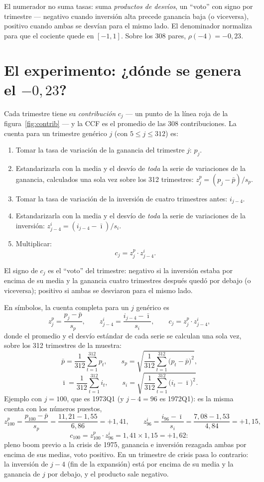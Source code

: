 \documentclass[11pt,a4paper]{article}
\begin{document}
El numerador no suma tasas: suma \emph{productos de desv\'ios}, un ``voto'' con
signo por trimestre --- negativo cuando inversi\'on alta precede ganancia baja
(o viceversa), positivo cuando ambas se desv\'ian para el mismo lado. El
denominador normaliza para que el cociente quede en $[-1,1]$. Sobre los 308
pares, $\rho(-4) = -0{,}23$.

\section{El experimento: ¿d\'onde se genera el $-0{,}23$?}

Cada trimestre tiene su \emph{contribuci\'on} $c_j$ --- un punto de la l\'inea
roja de la figura~\ref{fig:contrib} --- y la CCF es el promedio de las 308
contribuciones. La cuenta para un trimestre gen\'erico $j$ (con
$5 \leq j \leq 312$) es:
\begin{enumerate}
\item Tomar la tasa de variaci\'on de la ganancia del trimestre $j$: $p_j$.
\item Estandarizarla con la media y el desv\'io de \emph{toda} la serie de
variaciones de la ganancia, calculados una sola vez sobre los 312 trimestres:
$z^p_j = (p_j - \bar p)/s_p$.
\item Tomar la tasa de variaci\'on de la inversi\'on de cuatro trimestres
antes: $i_{j-4}$.
\item Estandarizarla con la media y el desv\'io de \emph{toda} la serie de
variaciones de la inversi\'on: $z^i_{j-4} = (i_{j-4} - \bar\imath)/s_i$.
\item Multiplicar:
\[
c_j = z^p_j \cdot z^i_{j-4}.
\]
\end{enumerate}
El signo de $c_j$ es el ``voto'' del trimestre: negativo si la inversi\'on
estaba por encima de su media y la ganancia cuatro trimestres despu\'es qued\'o
por debajo (o viceversa); positivo si ambas se desviaron para el mismo lado.

En s\'imbolos, la cuenta completa para un $j$ gen\'erico es
\[
z^p_j = \frac{p_j - \bar p}{s_p},
\qquad
z^i_{j-4} = \frac{i_{j-4} - \bar\imath}{s_i},
\qquad
c_j = z^p_j \cdot z^i_{j-4},
\]
donde el promedio y el desv\'io est\'andar de cada serie se calculan una sola
vez, sobre los 312 trimestres de la muestra:
\[
\bar p = \frac{1}{312}\sum_{t=1}^{312} p_t,
\qquad
s_p = \sqrt{\frac{1}{312}\sum_{t=1}^{312} \bigl(p_t - \bar p\bigr)^2},
\]
\[
\bar\imath = \frac{1}{312}\sum_{t=1}^{312} i_t,
\qquad
s_i = \sqrt{\frac{1}{312}\sum_{t=1}^{312} \bigl(i_t - \bar\imath\bigr)^2}.
\]
Ejemplo con $j = 100$, que es 1973Q1 (y $j-4 = 96$ es 1972Q1): es la misma
cuenta con los n\'umeros puestos,
\[
z^p_{100} = \frac{p_{100} - \bar p}{s_p} = \frac{11{,}21 - 1{,}55}{6{,}86} = +1{,}41,
\qquad
z^i_{96} = \frac{i_{96} - \bar\imath}{s_i} = \frac{7{,}08 - 1{,}53}{4{,}84} = +1{,}15,
\]
\[
c_{100} = z^p_{100} \cdot z^i_{96} = 1{,}41 \times 1{,}15 = +1{,}62 :
\]
pleno boom previo a la crisis de 1975, ganancia e inversi\'on rezagada ambas
por encima de sus medias, voto positivo. En un trimestre de crisis pasa lo
contrario: la inversi\'on de $j-4$ (fin de la expansi\'on) est\'a por encima de
su media y la ganancia de $j$ por debajo, y el producto sale negativo.
\end{document}
